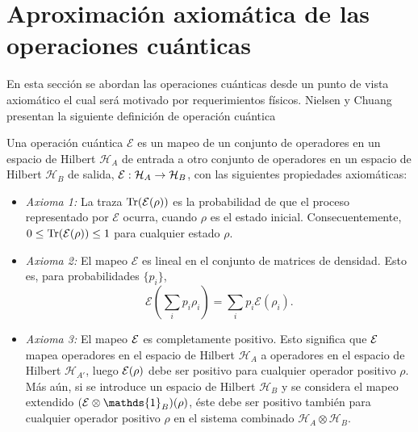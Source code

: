 \section{Aproximación axiomática de las operaciones cuánticas} %
En esta sección se abordan las operaciones cuánticas desde un punto de vista
axiomático el cual será motivado por requerimientos físicos. 
Nielsen y
Chuang {\cite{nielsen_chuang_2010}}
presentan la siguiente definición de operación cuántica \begin{definition}\label{DefE(rho)} Una operación cuántica $\mathcal{E}$ es un mapeo de un conjunto de operadores en un espacio de Hilbert $\mathcal{H}_A$ de entrada a otro conjunto de operadores en un espacio de Hilbert $\mathcal{H}_B$ de salida, $\mathcal{E}: \mathcal{H}_A \rightarrow \mathcal{H}_B$, con las siguientes propiedades axiomáticas:

    \begin{itemize}
        \item \textit{Axioma 1:} La traza ${\rm Tr} (\mathcal{E}(\rho))$ es la probabilidad de que el proceso representado por $\mathcal{E}$ ocurra, cuando $\rho$ es el estado inicial. Consecuentemente, $0 \le {\rm Tr} (\mathcal{E}(\rho)) \le 1$ para cualquier estado $\rho$.
	\item \textit{Axioma 2:} El mapeo $\mathcal{E}$ es lineal 
 en el conjunto de matrices de densidad.
Esto es, para probabilidades
$\{p_i\}$, \[\mathcal{E}\left(\sum _i p_i \rho _i\right)=\sum_i p_i
\mathcal{E}(\rho_i).\]
	\item\textit{Axioma 3:} El mapeo $\mathcal{E}$ es completamente positivo. Esto
significa que $\mathcal{E}$ mapea  operadores en el espacio de Hilbert
$\mathcal{H}_{A}$  a operadores en el espacio de Hilbert $\mathcal{H}_{A'}$, luego $\mathcal{E}(\rho)$ debe ser positivo para cualquier operador positivo $\rho $. Más aún, si se introduce un espacio de Hilbert $ \mathcal{H}_{B}$ y se considera el mapeo extendido $(\E \otimes \mathds{1}_B)(\rho)$, éste debe ser positivo también para cualquier operador positivo $\rho$ en el sistema combinado $\mathcal{H}_A\otimes \mathcal{H}_B$. 
    \end{itemize}
\end{definition}

